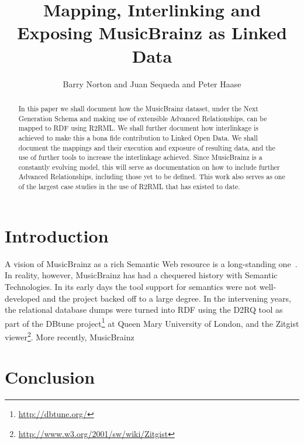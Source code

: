 \documentclass{llncs}
\begin{document}
\title{Mapping, Interlinking and Exposing MusicBrainz as Linked Data}

\author{Barry Norton and Juan Sequeda and Peter Haase}


\maketitle

\begin{abstract}
In this paper we shall document how the MusicBrainz dataset, under the
Next Generation Schema and making use of extensible Advanced
Relationships, can be mapped to RDF using R2RML. We shall further
document how interlinkage is achieved to make this a bona fide
contribution to Linked Open Data. We shall document the mappings and
their execution and exposure of resulting data, and the use of further
tools to increase the interlinkage achieved. Since MusicBrainz is a
constantly evolving model, this will serve as documentation on how to
include further Advanced Relationships, including those yet to be
defined. This work also serves as one of the largest case studies in
the use of R2RML that has existed to date.
\end{abstract}

\section{Introduction}\label{sec:Introduction}
A vision of MusicBrainz as a rich Semantic Web resource is a
long-standing one~\cite{DBLP:journals/expert/Swartz02}. In reality,
however, MusicBrainz has had a chequered history with Semantic
Technologies. In its early days the tool support for semantics were
not well-developed and the project backed off to a large degree. In
the intervening years, the relational database dumps were turned into
RDF using the D2RQ tool as part of the DBtune
project\footnote{\url{http://dbtune.org/}} at Queen Mary University of
London, and the Zitgist
viewer\footnote{\url{http://www.w3.org/2001/sw/wiki/Zitgist}}. More
recently, MusicBrainz

\section{Conclusion}\label{sec:Conclusion}



\end{document}

